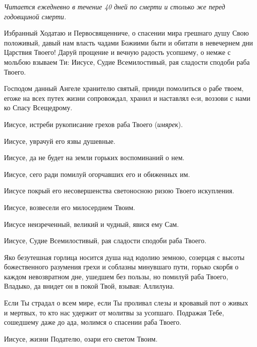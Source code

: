 \begin{mymulticols}
 


{\itshape Читается ежедневно в течение 40 дней по смерти и столько же перед годовщиной смерти.} 


Избранный Ходатаю и Первосвященниче, о спасении мира грешнаго душу Свою положивый, давый нам власть чадами Божиими быти и обитати в невечернем дни Царствия Твоего! Даруй прощение и вечную радость усопшему, о немже с мольбою взываем Ти: Иисусе, Судие Всемилостивый, рая сладости сподоби раба Твоего.




Господом данный Ангеле хранителю святый, прииди помолиться о рабе твоем, егоже на всех путех жизни сопровождал, хранил и наставлял еcи, воззови с нами ко Спасу Всещедрому. 

Иисусе, истреби рукописание грехов раба Твоего ({\itshape имярек}). 

Иисусе, уврачуй его язвы душевные. 

Иисусе, да не будет на земли горьких воспоминаний о нем. 

Иисусе, сего ради помилуй огорчавших его и обиженных им. 

Иисусе покрый его несовершенства светоносною ризою Твоего искупления. 

Иисусе, возвесели его милосердием Твоим. 

Иисусе неизреченный, великий и чудный, явися ему Сам. 

Иисусе, Судие Всемилостивый, рая сладости сподоби раба Твоего.




Яко безутешная горлица носится душа над юдолию земною, созерцая с высоты божественного разумения грехи и соблазны минувшаго пути, горько скорбя о каждом невозвратном дне, ушедшем без пользы, но помилуй раба Твоего, Владыко, да внидет он в покой Твой, взывая: Аллилуиа.




Если Ты страдал о всем мире, если Ты проливал слезы и кровавый пот о живых и мертвых, то кто нас удержит от молитвы за усопшаго. Подражая Тебе, сошедшему даже до ада, молимся о спасении раба Твоего. 

Иисусе, жизни Подателю, озари его светом Твоим. 


\end{mymulticols}
